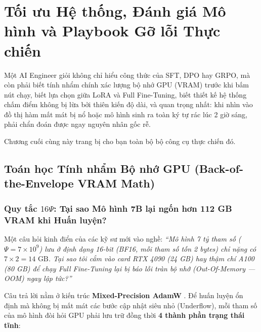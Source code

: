 \chapter{Tối ưu Hệ thống, Đánh giá Mô hình và Playbook Gỡ lỗi Thực chiến}
\label{ch:systems_eval}

Một AI Engineer giỏi không chỉ hiểu công thức của SFT, DPO hay GRPO, mà còn phải biết tính nhẩm chính xác lượng bộ nhớ GPU (VRAM) trước khi bấm nút chạy, biết lựa chọn giữa LoRA và Full Fine-Tuning, biết thiết kế hệ thống chấm điểm không bị lừa bởi thiên kiến độ dài, và quan trọng nhất: khi nhìn vào đồ thị hàm mất mát bị nổ hoặc mô hình sinh ra toàn ký tự rác lúc 2 giờ sáng, phải chẩn đoán được ngay nguyên nhân gốc rễ.

Chương cuối cùng này trang bị cho bạn toàn bộ bộ công cụ thực chiến đó.

\section{Toán học Tính nhẩm Bộ nhớ GPU (Back-of-the-Envelope VRAM Math)}
\label{sec:vram_math}

\subsection{Quy tắc \texorpdfstring{$16\Psi$}{16 Psi}: Tại sao Mô hình 7B lại ngốn hơn 112 GB VRAM khi Huấn luyện?}

Một câu hỏi kinh điển của các kỹ sư mới vào nghề: \textit{``Mô hình 7 tỷ tham số ($\Psi = 7 \times 10^9$) lưu ở định dạng 16-bit (BF16, mỗi tham số tốn 2 bytes) chỉ nặng có $7 \times 2 = 14\text{ GB}$. Tại sao tôi cắm vào card RTX 4090 (24 GB) hay thậm chí A100 (80 GB) để chạy Full Fine-Tuning lại bị báo lỗi tràn bộ nhớ (Out-Of-Memory --- OOM) ngay lập tức?''}

Câu trả lời nằm ở kiến trúc \textbf{Mixed-Precision AdamW} \citep{micikevicius2018mixed, loshchilov2019decoupled, rajbhandari2020zero}. Để huấn luyện ổn định mà không bị mất mát các bước cập nhật siêu nhỏ (Underflow), mỗi tham số của mô hình đòi hỏi GPU phải lưu trữ đồng thời \textbf{4 thành phần trạng thái tĩnh}:

